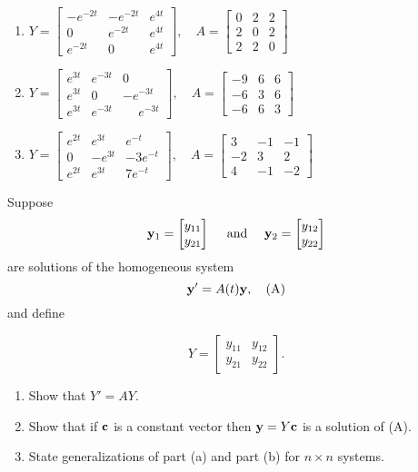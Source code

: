 \documentclass{ximera}
\begin{document}
\begin{problem}
\begin{enumerate}
\item %
 $Y = \begin{bmatrix} -e^{-2t} &
-e^{-2t} & e^{4t}\\ 0 & e^{-2t} & e^{4t} \\
e^{-2t} & 0 & e^{4t}\end{bmatrix}, \quad A =
\begin{bmatrix} 0 & 2 & 2 \\ 2 & 0 & 2\\ 2 & 2 & 0\end{bmatrix}$

\item %
 $Y = \begin{bmatrix}e^{3t} & 
e^{-3t} & 0\\ e^{3t} & 0 & -e^{-3t}\\ e^{3t} &
e^{-3t} & \phantom{-}e^{-3t}\end{bmatrix}, \quad A = \begin{bmatrix}
-9 & 6& 6\\-6& 3 &6\\-6 & 6 & 3\end{bmatrix}$

\item %
 $Y = \left[\begin{array}{crr} e^{2t}&e^{3t}&
e^{-t}\\ 0&-e^{3t}&-3e^{-t}\\ e^{2t}&e^{3t}&7e^{-t}\end{array}\right] ,
\quad A =
\begin{bmatrix} 3 & -1 & -1\\-2 & 3 & 2\\  4 & -1 & -2\end{bmatrix}$
 \end{enumerate}
 \end{problem}

\begin{problem}\label{exer:10.2.9}
 Suppose
$$
{\bf y}_1=\begin{bmatrix}y_{11}\\y_{21}\end{bmatrix}\quad\text{ and }\quad{\bf
y}_2=\begin{bmatrix}y_{12}\\y_{22}\end{bmatrix}$$ are solutions of the homogeneous system
$$
{\bf y}'=A(t){\bf y},
\quad\text{(A)}
$$
and define

$$Y=
\begin{bmatrix}y_{11} & y_{12} \\ y_{21} & y_{22}\end{bmatrix}.
$$
\begin{enumerate}
\item %
 Show that $Y'=AY$.
\item %
 Show that if ${\bf c}$ is a constant vector then ${\bf y}=
Y{\bf c}$
 is a solution of  (A).
\item %
 State generalizations of  part (a) and part (b) for $n\times n$
systems.
\end{enumerate}
\end{problem}
\end{document}
